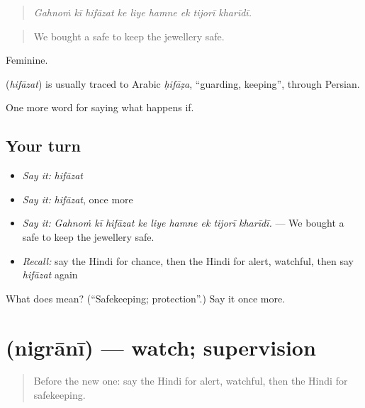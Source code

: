 \begin{quote}
\emph{Gahnoṁ kī hifāzat ke liye hamne ek tijorī kharīdī.}
\end{quote}

\begin{quote}
We bought a safe to keep the jewellery safe.
\end{quote}

Feminine.

\begin{cousinweb}
\textbf{} (\emph{hifāzat}) is usually traced to Arabic \emph{ḥifāẓa}, \textquotedblleft{}guarding, keeping\textquotedblright{}, through Persian.
\end{cousinweb}

\begin{grammarlens}[title={What you've built}]
One more word for saying what happens if.
\end{grammarlens}

\subsection*{Your turn}
\begin{itemize}
\raggedright
  \item \emph{Say it:} \emph{hifāzat}
  \item \emph{Say it:} \emph{hifāzat}, once more
  \item \emph{Say it:} \emph{Gahnoṁ kī hifāzat ke liye hamne ek tijorī kharīdī.} — We bought a safe to keep the jewellery safe.
  \item \emph{Recall:} say the Hindi for chance, then the Hindi for alert, watchful, then say \emph{hifāzat} again
\end{itemize}

\begin{tcolorbox}[breakable,colback=teal!4,colframe=teal!35!black,title={Before you move on}]
What does  mean? (\textquotedblleft{}Safekeeping; protection\textquotedblright{}.) Say it once more.
\end{tcolorbox}
\section[\texorpdfstring{\hi{निगरानी} (nigrānī)}{निगरानी (nigrānī)}]{ (nigrānī) — watch; supervision}

\label{lesson:HI-C547-nigrani}



\begin{quote}
Before the new one: say the Hindi for alert, watchful, then the Hindi for safekeeping.
\end{quote}

